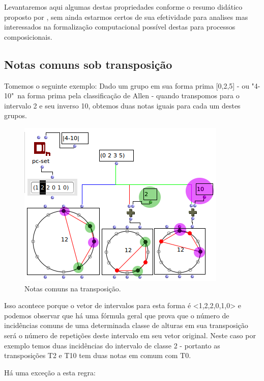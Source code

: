 \documentclass[
	12pt,				%
	openright,			%
	twoside,			%
	a4paper,			%
	english,			%
	french,				%
	spanish,			%
	brazil				%
	]{abntex2}
\begin{document}
\begin{apendicesenv}
Levantaremos aqui algumas destas propriedades conforme o resumo didático proposto por , sem ainda estarmos certos de sua efetividade para analises mas interessados na formalização computacional possível destas para processos composicionais.


\subsection{Notas comuns sob transposição}

Tomemos o seguinte exemplo: Dado um grupo em sua forma prima [0,2,5] - ou "4-10"\ na forma prima pela classificação de Allen  - quando transpomos para o intervalo 2 e seu inverso 10, obtemos duas notas iguais para cada um destes grupos.

\begin{figure}[!h]
	\caption{\label{fig_grafico}Notas comuns na transposição. }
	\begin{center}
	    \includegraphics[scale=0.7]{OM_settheory/notas_comuns_2e10.png}
	\end{center}
\end{figure}



Isso acontece porque o vetor de intervalos para esta forma é <1,2,2,0,1,0> e podemos observar que há uma fórmula geral que prova que o número de incidências comuns de uma determinada classe de alturas em sua transposição será o número de repetições deste intervalo em seu vetor original. Neste caso por exemplo temos duas incidências do intervalo de classe 2 - portanto as transposições T2 e T10 tem duas notas em comum com T0.

Há uma exceção a esta regra:
 

\end{apendicesenv}
\end{document}
